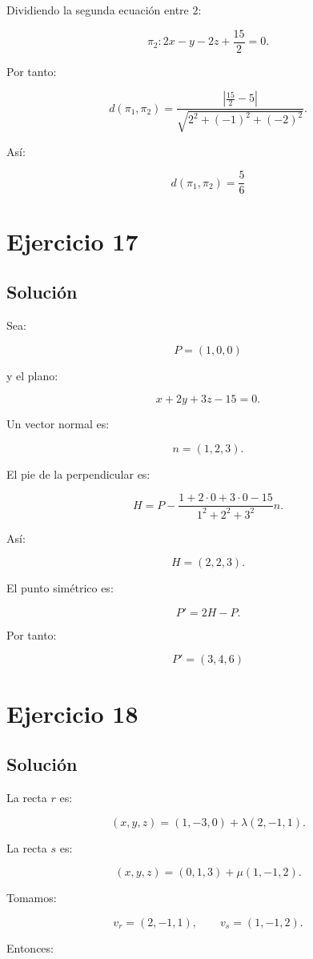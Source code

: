 \documentclass[11pt,a4paper]{article}
\begin{document}
Dividiendo la segunda ecuación entre \(2\):

\[
\pi_2:
2x-y-2z+\frac{15}{2}=0.
\]

Por tanto:

\[
d(\pi_1,\pi_2)
=
\frac{
\left|
\frac{15}{2}-5
\right|
}{
\sqrt{2^2+(-1)^2+(-2)^2}
}.
\]

Así:

\[
\boxed{
d(\pi_1,\pi_2)
=
\frac56
}
\]

\section{Ejercicio 17}
\subsection{Solución}

Sea:

\[
P=(1,0,0)
\]

y el plano:

\[
x+2y+3z-15=0.
\]

Un vector normal es:

\[
n=(1,2,3).
\]

El pie de la perpendicular es:

\[
H
=
P
-
\frac{
1+2\cdot0+3\cdot0-15
}{
1^2+2^2+3^2
}
n.
\]

Así:

\[
H=(2,2,3).
\]

El punto simétrico es:

\[
P'
=
2H-P.
\]

Por tanto:

\[
\boxed{
P'=(3,4,6)
}
\]

\section{Ejercicio 18}
\subsection{Solución}

La recta \(r\) es:

\[
(x,y,z)
=
(1,-3,0)
+
\lambda(2,-1,1).
\]

La recta \(s\) es:

\[
(x,y,z)
=
(0,1,3)
+
\mu(1,-1,2).
\]

Tomamos:

\[
v_r=(2,-1,1),
\qquad
v_s=(1,-1,2).
\]

Entonces:
\end{document}
